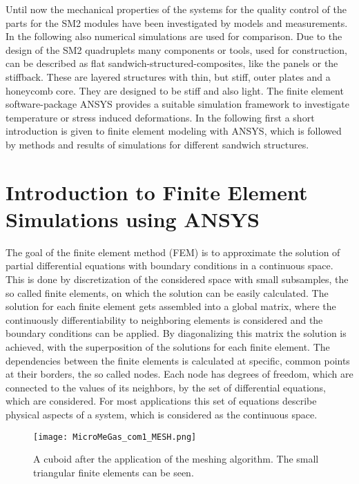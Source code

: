 \documentclass[
a4paper,                                %
twoside,                                %
BCOR1.4cm,                      %
10pt,                           %
headings=normal,                %
headsepline,                    %
clearplainpage, %
final,                                  %
div=14,
parskip=full,
openright,
bibliography=toc
]{scrreprt}
\begin{document}
Until now the mechanical properties of the systems for the quality control of the parts for the SM2 modules have been investigated by models and measurements. In the following also numerical simulations are used for comparison.
Due to the design of the SM2 quadruplets many components or tools, used for construction, can be described as flat sandwich-structured-composites, like the panels or the stiffback. These are layered structures with thin, but stiff, outer plates and a honeycomb core. They are designed to be stiff and also light. The finite element software-package ANSYS provides a suitable simulation framework to investigate temperature or stress induced deformations. In the following first a short introduction is given to finite element modeling with ANSYS, which is followed by methods and results of simulations for different sandwich structures.

\section{Introduction to Finite Element Simulations using ANSYS}

The goal of the finite element method (FEM) is to approximate the solution of partial differential equations with boundary conditions in a continuous space. This is done by discretization of the considered space with small subsamples, the so called finite elements, on which the solution can be easily calculated. The solution for each finite element gets assembled into a global matrix, where the continuously differentiability to neighboring elements is considered and the boundary conditions can be applied. By diagonalizing this matrix the solution is achieved, with the superposition of the solutions for each finite element. The dependencies between the finite elements is calculated at specific, common points at their borders, the so called nodes. Each node has degrees of freedom, which are connected to the values of its neighbors, by the set of differential equations, which are considered. For most applications this set of equations describe physical aspects of a system, which is considered as the continuous space.

\begin{figure}[H]
	\centering
	\texttt{[image: MicroMeGas\_com1\_MESH.png]}
	\caption{A cuboid after the application of the meshing algorithm. The small triangular finite elements can be seen.}
	\label{meshOfFiniteElements}
\end{figure}
\end{document}
